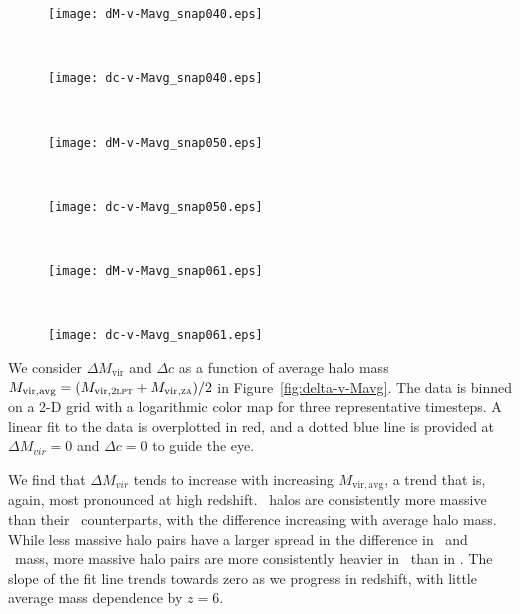 \begin{figure*}[t]
	\centering
	\begin{subfigure}{}
		\texttt{[image: dM-v-Mavg\_snap040.eps]}
	\end{subfigure}
	~
	\begin{subfigure}{}
		\texttt{[image: dc-v-Mavg\_snap040.eps]}
	\end{subfigure}
	\\
	\begin{subfigure}{}
		\texttt{[image: dM-v-Mavg\_snap050.eps]}
	\end{subfigure}
	~
	\begin{subfigure}{}
		\texttt{[image: dc-v-Mavg\_snap050.eps]}
	\end{subfigure}
	\\
	\begin{subfigure}{}
		\texttt{[image: dM-v-Mavg\_snap061.eps]}
	\end{subfigure}
	~
	\begin{subfigure}{}
		\texttt{[image: dc-v-Mavg\_snap061.eps]}
	\end{subfigure}
	\caption[$\Delta M_{\mathrm{vir}}$ and $\Delta c$ as a function of $M_{\mathrm{vir,avg}}$]{\footnotesize $\Delta M_{\mathrm{vir}}$ (left column) and $\Delta c$ (right column) as functions of $M_{\mathrm{vir,avg}}$.  Halos are counted in 2-D rectangular bins and smoothed with a Gaussian kernel with a logarithmic color scale.  The red line is the least-squares best fit to the data.  The blue dashed line at zero is provided to guide the eye.  The three rows again correspond to snapshots at $z = 14.7$, $z = 10.3$, and $z = 6.0$, respectively.}
	\label{fig:delta-v-Mavg}
\end{figure*}

We consider $\Delta M_{\mathrm{vir}}$ and $\Delta c$ as a function of average halo mass $M_{\mathrm{vir,avg}} = (M_{\mathrm{vir},\textsc{2lpt}} + M_{\mathrm{vir},\textsc{za}}) / 2$ in Figure~\ref{fig:delta-v-Mavg}.  The data is binned on a 2-D grid with a logarithmic color map for three representative timesteps.  A linear fit to the data is overplotted in red, and a dotted blue line is provided at $\Delta M_{vir} = 0$ and $\Delta c = 0$ to guide the eye.

We find that $\Delta M_{vir}$ tends to increase with increasing $M_{\mathrm{vir,avg}}$, a trend that is, again, most pronounced at high redshift.  \lpt\ halos are consistently more massive than their \za\ counterparts, with the difference increasing with average halo mass.  While less massive halo pairs have a larger spread in the difference in \lpt\ and \za\ mass, more massive halo pairs are more consistently heavier in \lpt\ than in \za.  The slope of the fit line trends towards zero as we progress in redshift, with little average mass dependence by $z = 6$.

